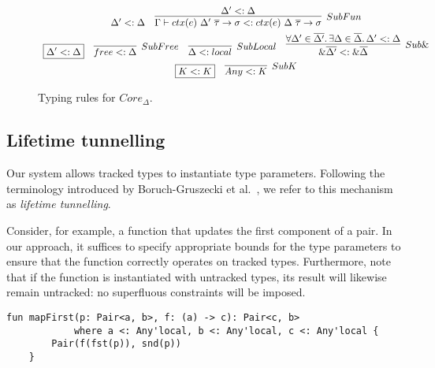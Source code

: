 \documentclass[acmsmall,review,screen]{acmart}
\newcommand{\mathframebox}[1]{\framebox{$\displaystyle #1$}}
\newcommand{\ctx}[1]{ctx(#1)~}
\begin{document}
\begin{figure}
\begin{gather*}
\begin{array}{cc}
{            } {
                \Delta' <: \Delta
            } &
            \infer[SubFun]{ %
                \Gamma\vdash\ctx{e}\Delta'~\overline{\tau}\to\sigma <: \ctx{e}\Delta~\overline{\tau}\to\sigma
            }{
                \Delta' <: \Delta
            }
        \end{array} \\
        \begin{array}{cccc}
            \mathframebox{\Delta' <: \Delta} &
            \infer[SubFree]{free <: \Delta}{} &
            \infer[SubLocal]{\Delta <: local}{} &
            \infer[Sub\&]{
                \&\overline{\Delta'} <: \&\overline{\Delta}
            }{
                \forall\Delta'\in\overline{\Delta'}\ldotp\exists\Delta\in\overline{\Delta}\ldotp \Delta' <: \Delta
            }
        \end{array} \\
        \begin{array}{cc}
            \mathframebox{K <: K} & \infer[SubK]{Any <: K}{}
        \end{array}
    \end{gather*}
    \caption{Typing rules for $Core_{\Delta}$.}
    \label{fig:core-delta-typing}
\end{figure}




\subsection{Lifetime tunnelling}

Our system allows tracked types to instantiate type parameters.
Following the terminology introduced by Boruch-Gruszecki et al.~\cite{boruch2023capturing}, we refer to this mechanism as \emph{lifetime tunnelling}.

Consider, for example, a function that updates the first component of a pair.
In our approach, it suffices to specify appropriate bounds for the type parameters to ensure that the function correctly operates on tracked types.
Furthermore, note that if the function is instantiated with untracked types, its result will likewise remain untracked: no superfluous constraints will be imposed.
\begin{lstlisting}[language=colang]
    fun mapFirst(p: Pair<a, b>, f: (a) -> c): Pair<c, b>
            where a <: Any'local, b <: Any'local, c <: Any'local {
        Pair(f(fst(p)), snd(p))
    }
\end{lstlisting}
\end{document}
